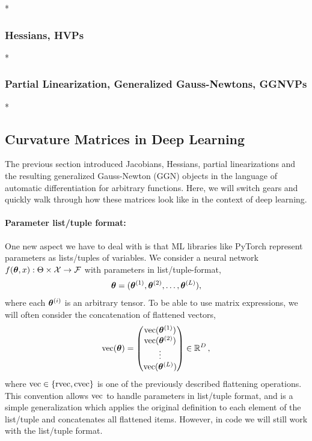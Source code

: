 \switchcolumn[0]*
\subsubsection{Hessians, HVPs}


\switchcolumn[0]*
\subsubsection{Partial Linearization, Generalized Gauss-Newtons, GGNVPs}\label{sec:partial_linearization}


\switchcolumn[0]*
\subsection{Curvature Matrices in Deep Learning}

The previous section introduced Jacobians, Hessians, partial linearizations and the resulting generalized Gauss-Newton (GGN) objects in the language of automatic differentiation for arbitrary functions.
Here, we will switch gears and quickly walk through how these matrices look like in the context of deep learning.

\paragraph{Parameter list/tuple format:} One new aspect we have to deal with is that ML libraries like PyTorch represent parameters as lists/tuples of variables.
We consider a neural network $f(\vtheta, x): \Theta \times \gX \to \gF$ with parameters in list/tuple-format,
\begin{align*}
  \vtheta = (\vtheta^{(1)}, \vtheta^{(2)}, \ldots, \vtheta^{(L)}),
\end{align*}
where each $\vtheta^{(i)}$ is an arbitrary tensor. To be able to use matrix expressions, we will often consider the concatenation of flattened vectors,
\begin{align*}
  \vec(\vtheta)
  =
  \begin{pmatrix}
    \vec(\vtheta^{(1)}) \\
    \vec(\vtheta^{(2)}) \\
    \vdots              \\
    \vec(\vtheta^{(L)})
  \end{pmatrix}
  \in \sR^D
  \,,
\end{align*}
where $\vec \in \{ \rvec, \cvec \}$ is one of the previously described flattening operations.
This convention allows $\vec$ to handle parameters in list/tuple format, and is a simple generalization which applies the original definition to each element of the list/tuple and concatenates all flattened items.
However, in code we will still work with the list/tuple format.

